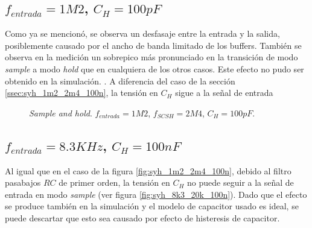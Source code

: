 \documentclass[../../ASSD_TP1_G7.tex]{subfiles}
\begin{document}
\subsection{$f_{entrada}=1M2$, $C_H = 100pF$ } \label{ssec:syh_1m2_2m4_100p}
Como ya se mencion\'o, se observa un desfasaje entre la entrada y la salida, posiblemente causado por el ancho de banda limitado de los buffers. 
Tambi\'en se observa en la medici\'on un sobrepico m\'as pronunciado en la transici\'on de modo \textit{sample} a modo \textit{hold} que en cualquiera de los otros casos. 
Este efecto no pudo ser obtenido en la simulaci\'on. . 
A diferencia del caso de la secci\'on \ref{ssec:syh_1m2_2m4_100n}, la tensi\'on en $C_H$ sigue a la se\~nal de entrada


\begin{figure}[H]
	\centering
	\begin{subfigure}[t]{0.45\linewidth}
		
		\label{fig:syh_1m2_2m4_100p_med}	
	\end{subfigure}
	\begin{subfigure}[t]{0.45\linewidth}
		
		\label{fig:syh_1m2_2m4_100p_sim}
	\end{subfigure}
	\caption{\textit{Sample and hold}. $f_{entrada} = 1M2$, $f_{SCSH}=2M4$, $C_H = 100pF$.}
	\label{fig:syh_1m2_2m4_100p}
\end{figure}

\subsection{$f_{entrada}=8.3KHz$, $C_H = 100nF$ }
Al igual que en el caso de la figura \ref{fig:syh_1m2_2m4_100n}, debido al filtro pasabajos $RC$ de primer orden, la tensi\'on en $C_H$ no puede seguir a la se\~nal de entrada en modo \textit{sample} (ver figura \ref{fig:syh_8k3_20k_100n}). Dado que el efecto se produce tambi\'en en la simulaci\'on y el modelo de capacitor usado es ideal, se puede descartar que esto sea causado por efecto de histeresis de capacitor. 

\end{document}
